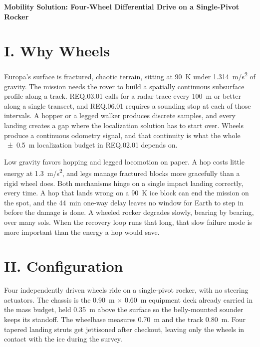 \documentclass[11pt]{article}
\begin{document}
\noindent\textbf{\large Mobility Solution: Four-Wheel Differential Drive on a Single-Pivot Rocker}

\bigskip

\section*{I. Why Wheels}

Europa's surface is fractured, chaotic terrain, sitting at \SI{90}{K} under \SI{1.314}{m/s^2} of gravity. The
mission needs the rover to build a spatially continuous subsurface profile along a track. REQ.03.01 calls for a
radar trace every \SI{100}{m} or better along a single transect, and REQ.06.01 requires a sounding stop at each
of those intervals. A hopper or a legged walker produces discrete samples, and every landing creates a gap where
the localization solution has to start over. Wheels produce a continuous odometry signal, and that continuity is
what the whole \SI{\pm 0.5}{m} localization budget in REQ.02.01 depends on.

Low gravity favors hopping and legged locomotion on paper. A hop costs little energy at \SI{1.3}{m/s^2}, and legs
manage fractured blocks more gracefully than a rigid wheel does. Both mechanisms hinge on a single impact landing
correctly, every time. A hop that lands wrong on a \SI{90}{K} ice block can end the mission on the spot, and the
\SI{44}{min} one-way delay leaves no window for Earth to step in before the damage is done. A wheeled rocker
degrades slowly, bearing by bearing, over many sols. When the recovery loop runs that long, that slow failure
mode is more important than the energy a hop would save.

\bigskip

\section*{II. Configuration}

Four independently driven wheels ride on a single-pivot rocker, with no steering actuators. The chassis is the
\SI{0.90}{m} $\times$ \SI{0.60}{m} equipment deck already carried in the mass budget, held \SI{0.35}{m} above
the surface so the belly-mounted sounder keeps its standoff. The wheelbase measures \SI{0.70}{m} and the track
\SI{0.80}{m}. Four tapered landing struts get jettisoned after checkout, leaving only the wheels in contact with
the ice during the survey.
\end{document}
